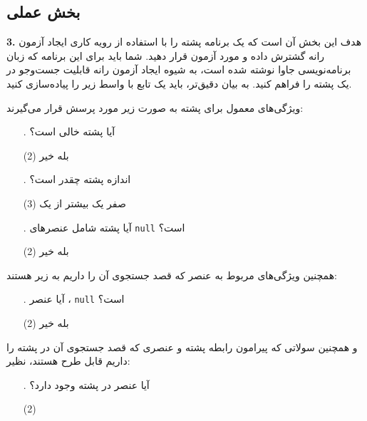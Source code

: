 \documentclass[twoside]{article}
\newenvironment{answer}{}{\medskip}
\newenvironment{question}[1]{\textbf{#1.} }{}
\begin{document}
\subsection*{بخش عملی}
\begin{question}{3}
هدف این بخش آن است که یک برنامه پشته را با استفاده از رویه کاری ایجاد آزمون رانه گشترش داده و مورد آزمون قرار دهید. شما باید برای این برنامه که زبان برنامه‌نویسی جاوا نوشته شده است، به شیوه ایجاد آزمون رانه قابلیت جست‌و‌جو در یک پشته را فراهم کنید. به بیان دقیق‌تر، باید یک تابع با واسط زیر را پیاده‌سازی کنید.

\end{question}
\begin{answer}
ویژگی‌های معمول برای پشته به صورت زیر مورد پرسش قرار می‌گیرند:
\begin{enumerate}
	\item[\lr{\textbf{A}}.]
آیا پشته خالی است؟
	\begin{tasks}(2)
		\task[\lr{1}. ]
بله
		\task[\lr{2}. ]
خیر
	\end{tasks}
	\item[\lr{\textbf{B}}.]
اندازه پشته چقدر است؟
	\begin{tasks}(3)
		\task[\lr{1}. ]
صفر
		\task[\lr{2}. ]
یک
		\task[\lr{3}. ]
بیشتر از یک
	\end{tasks}
	\item[\lr{\textbf{C}}.]
آیا پشته شامل عنصرهای \texttt{null} است؟
	\begin{tasks}(2)
		\task[\lr{1}. ]
بله
		\task[\lr{2}. ]
خیر
	\end{tasks}
\end{enumerate}
همچنین ویژگی‌های مربوط به عنصر که قصد جستجوی آن را داریم به زیر هستند:
\begin{enumerate}[label=.\Alph*]
	\item[\lr{\textbf{D}}.]
آیا عنصر ، \texttt{null} است؟
	\begin{tasks}(2)
		\task[\lr{1}. ]
بله
		\task[\lr{2}. ]
خیر
	\end{tasks}
\end{enumerate}
و همچنین سولاتی که پیرامون رابطه پشته و عنصری که قصد جستجوی آن در پشته را داریم قابل طرح هستند، نظیر:
\begin{enumerate}[label=.\Alph*]
	\item[\lr{\textbf{E}}.]
آیا عنصر  در پشته وجود دارد؟
	\begin{tasks}(2)

\end{tasks}
\end{enumerate}
\end{answer}
\end{document}
